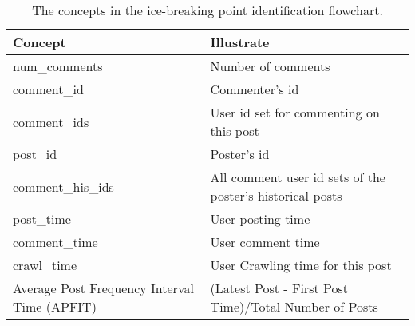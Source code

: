 \begin{table}[th]
	\small
	\begin{tabular}{p{}|p{}}
		\toprule
		\textbf{Concept} & \textbf{Illustrate} \\ \midrule
		num\_comments & Number of comments \\ \midrule
		comment\_id & Commenter's id   \\ \midrule
        comment\_ids & User id set for commenting on this post \\ \midrule
        post\_id & Poster's id   \\ \midrule
        comment\_his\_ids & All comment user id sets of the poster's historical posts   \\ \midrule
        post\_time & User posting time   \\ \midrule
comment\_time & User comment time   \\ \midrule
crawl\_time & User Crawling time for this post   \\ \midrule
Average Post Frequency Interval Time (APFIT) & (Latest Post - First Post Time)/Total Number of Posts   \\ \midrule
	\end{tabular}
	\caption{The concepts in the ice-breaking point identification flowchart.}
	\label{tab:concepts_of_ibkp}
\end{table}


